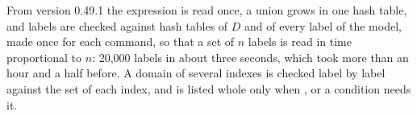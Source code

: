 From version 0.49.1 the expression is read once, a union grows in one hash
table, and labels are checked against hash tables of $D$ and of every label
of the model, made once for each command, so that a set of $n$ labels is
read in time proportional to $n$: 20,000 labels in about three seconds,
which took more than an hour and a half before. A domain of several indexes
is checked label by label against the set of each index, and is listed
whole only when ,  or a condition needs it.


\begin{alsosee}
\end{alsosee}
